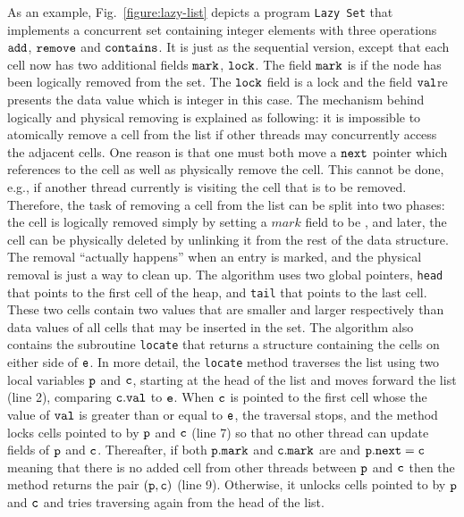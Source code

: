 As an example, Fig.~\ref{figure:lazy-list} depicts a program
{\tt Lazy Set} \cite{Lazyset}
that implements a concurrent set containing integer
elements with three operations $\tt add$, $\tt remove$ and $\tt contains$.
It is just as the sequential version,
except that each cell now has two additional fields ${\tt mark}$, ${\tt lock}$. The field $\tt mark$ is \true\; if
the node has been logically removed from the set. The ${\tt lock}$ field is a lock and the field ${\tt val}$re presents the data value which is integer in this case. The
mechanism behind logically and physical removing is explained as following: it is impossible to atomically remove a cell from the list if other threads may concurrently access the adjacent cells. One reason is that one must both move a $\tt next$ pointer which references to the cell as well as physically remove the cell. This cannot be done, e.g., if another thread currently is visiting the cell that is to be removed. Therefore, the task of removing a cell from the list  can be split into two phases: the cell is logically removed simply by setting a $mark$ field to be \true, and later, the cell can be physically deleted by unlinking it from the rest of the data structure. The removal “actually happens” when an entry is marked, and the physical removal is just a way to clean up.
The algorithm uses two global pointers, {\tt head} that points to  the first cell of the heap, and {\tt tail} that points to the last cell.  
These two cells contain two values that are smaller 
and larger respectively than data values of all cells that may be                     
inserted in the set. The algorithm also contains the subroutine {\tt locate} that returns a structure containing the cells on either side of $\tt e$. In more detail, the {\tt locate} method traverses the list using two local variables ${\tt p}$ and $\tt c$, starting at the head of the list and moves forward the list (line 2), comparing ${\tt c.val}$ to ${\tt e}$. When $\tt c$ is pointed to the
first cell whose the value of  $\tt val$ is greater than or equal to $\tt e$, the traversal stops, and the
method locks cells pointed to by $\tt p$ and $\tt c$ (line 7) so that no other thread can update fields of $\tt p$ and $\tt c$. Thereafter, if both $\tt p.mark$ and $\tt c.mark$ are \false \; and ${\tt p.next = c}$ meaning that there is no added cell from other threads between $\tt p$ and $\tt c$ then the method returns the pair $\tt (p,c)$ (line 9). Otherwise, it unlocks cells pointed to by $\tt p$ and $\tt c$ and tries traversing again from the head of the list.



